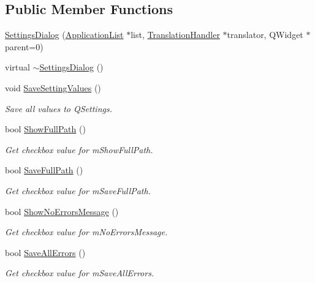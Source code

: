 \subsection*{Public Member Functions}
\begin{DoxyCompactItemize}
\item 
\hyperlink{class_settings_dialog_a8de59a6fa7e1f7e3ccdec8300271fff1}{Settings\-Dialog} (\hyperlink{class_application_list}{Application\-List} $\ast$list, \hyperlink{class_translation_handler}{Translation\-Handler} $\ast$translator, Q\-Widget $\ast$parent=0)
\item 
virtual \hyperlink{class_settings_dialog_ac48f54d4472902be0a3845a69167f068}{$\sim$\-Settings\-Dialog} ()
\item 
void \hyperlink{class_settings_dialog_a7bcb8c2fd3aace4e03d5a9449dbf03d8}{Save\-Setting\-Values} ()
\begin{DoxyCompactList}\small\item\em Save all values to Q\-Settings. \end{DoxyCompactList}\item 
bool \hyperlink{class_settings_dialog_a9320d2ea2aba1da144c36cc02fd7a68a}{Show\-Full\-Path} ()
\begin{DoxyCompactList}\small\item\em Get checkbox value for m\-Show\-Full\-Path. \end{DoxyCompactList}\item 
bool \hyperlink{class_settings_dialog_acc251fd3d12774ce3357851e2cd3cef9}{Save\-Full\-Path} ()
\begin{DoxyCompactList}\small\item\em Get checkbox value for m\-Save\-Full\-Path. \end{DoxyCompactList}\item 
bool \hyperlink{class_settings_dialog_a33a169deac9871227f0534c4c0a811d4}{Show\-No\-Errors\-Message} ()
\begin{DoxyCompactList}\small\item\em Get checkbox value for m\-No\-Errors\-Message. \end{DoxyCompactList}\item 
bool \hyperlink{class_settings_dialog_ad9d0973b9ea290296acecb41861d3bcf}{Save\-All\-Errors} ()
\begin{DoxyCompactList}\small\item\em Get checkbox value for m\-Save\-All\-Errors. \end{DoxyCompactList}\end{DoxyCompactItemize}
